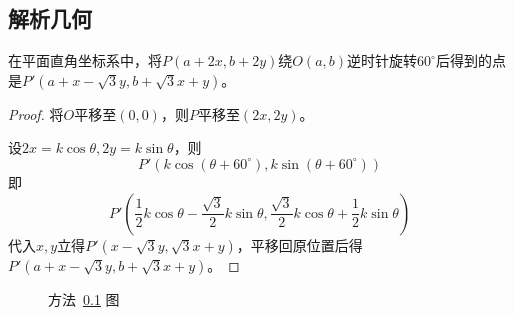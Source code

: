 \subsection{解析几何} \label{subsec:00B8-dec}

\begin{lemma} \label{lemma:00B8-decl}
  在平面直角坐标系中，将$P(a + 2x, b + 2y)$绕$O(a, b)$逆时针旋转$60^\circ$后得到的点是$P'(a + x - \sqrt3y, b + \sqrt3x + y)$。
\end{lemma}

\begin{proof}
  将$O$平移至$(0, 0)$，则$P$平移至$(2x, 2y)$。

  设$2x = k\cos\theta, 2y = k\sin\theta$，则
  \[ P'(k\cos(\theta + 60^\circ), k\sin(\theta + 60^\circ)) \]
  即
  \[ P'\left(\frac12k\cos\theta - \frac{\sqrt3}2k\sin\theta, \frac{\sqrt3}2k\cos\theta + \frac12k\sin\theta\right) \]
  代入$x, y$立得$P'(x - \sqrt3y, \sqrt3x + y)$，平移回原位置后得$P'(a + x - \sqrt3y, b + \sqrt3x + y)$。
\end{proof}

\begin{figure}[htbp]
  \centering {}
  \caption{方法~\ref{subsec:00B8-dec} 图}
  \label{fig:00B8-dec}
\end{figure}

